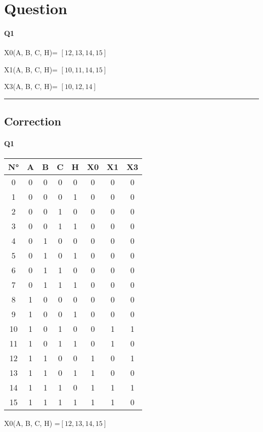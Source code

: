 
\section{Question}

\paragraph{Q1}


X0(A, B, C, H)= $[12, 13, 14, 15]$

X1(A, B, C, H)= $[10, 11, 14, 15]$

X3(A, B, C, H)= $[10, 12, 14]$


\hrule width 1\linewidth\pagebreak
\subsection{Correction}

\paragraph{Q1}

        \begin{tabular}{|c|c|c|c|c||c|c|c|}
    \toprule
        N° &A & B & C & H & X0 & X1 & X3\\ \midrule0 & 0 & 0 & 0 & 0 & 0 & 0 & 0\\1 & 0 & 0 & 0 & 1 & 0 & 0 & 0\\2 & 0 & 0 & 1 & 0 & 0 & 0 & 0\\3 & 0 & 0 & 1 & 1 & 0 & 0 & 0\\\midrule4 & 0 & 1 & 0 & 0 & 0 & 0 & 0\\5 & 0 & 1 & 0 & 1 & 0 & 0 & 0\\6 & 0 & 1 & 1 & 0 & 0 & 0 & 0\\7 & 0 & 1 & 1 & 1 & 0 & 0 & 0\\\midrule8 & 1 & 0 & 0 & 0 & 0 & 0 & 0\\9 & 1 & 0 & 0 & 1 & 0 & 0 & 0\\10 & 1 & 0 & 1 & 0 & 0 & 1 & 1\\11 & 1 & 0 & 1 & 1 & 0 & 1 & 0\\\midrule12 & 1 & 1 & 0 & 0 & 1 & 0 & 1\\13 & 1 & 1 & 0 & 1 & 1 & 0 & 0\\14 & 1 & 1 & 1 & 0 & 1 & 1 & 1\\15 & 1 & 1 & 1 & 1 & 1 & 1 & 0\\\bottomrule
        \end{tabular}
        X0(A, B, C, H) =$[12, 13, 14, 15]$

